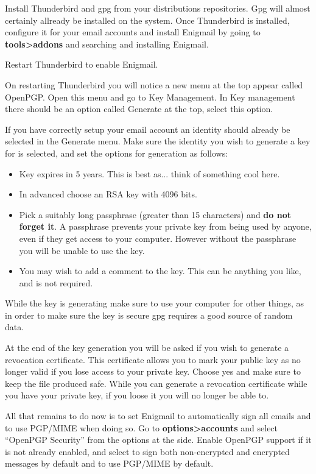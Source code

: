 \begin{compactenum}[1.]
    \item Install Thunderbird and gpg from your distributions repositories. Gpg will almost certainly allready be installed on the system. Once Thunderbird is installed, configure it for your email accounts and install Enigmail by going to \textbf{tools>addons} and searching and installing Enigmail.
    \item Restart Thunderbird to enable Enigmail.
    \item On restarting Thunderbird you will notice a new menu at the top appear called OpenPGP. Open this menu and go to Key Management. In Key management there should be an option called Generate at the top, select this option.
    \item If you have correctly setup your email account an identity should already be selected in the Generate menu. Make sure the identity you wish to generate a key for is selected, and set the options for generation as follows: 
        \begin{itemize}
            \item Key expires in 5 years. This is best as... think of something cool here.
            \item In advanced choose an RSA key with 4096 bits.
            \item Pick a suitably long passphrase (greater than 15 characters) and \textbf{do not forget it}. A passphrase prevents your private key from being used by anyone, even if they get access to your computer. However without the passphrase you will be unable to use the key.
            \item You may wish to add a comment to the key. This can be anything you like, and is not required.
        \end{itemize}
    \item While the key is generating make sure to use your computer for other things, as in order to make sure the key is secure gpg requires a good source of random data.
    \item At the end of the key generation you will be asked if you wish to generate a revocation certificate. This certificate allows you to mark your public key as no longer valid if you lose access to your private key. Choose yes and make sure to keep the file produced safe. While you can generate a revocation certificate while you have your private key, if you loose it you will no longer be able to.
    \item All that remains to do now is to set Enigmail to automatically sign all emails and to use PGP/MIME when doing so. Go to \textbf{options>accounts} and select ``OpenPGP Security'' from the options at the side. Enable OpenPGP support if it is not already enabled, and select to sign both non-encrypted and encrypted messages by default and to use PGP/MIME by default.

\end{compactenum}
